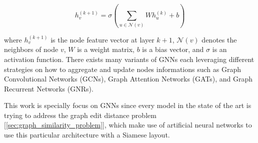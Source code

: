 \documentclass[../Thesis.tex]{subfiles}
\begin{document}
	\[
	h_v^{(k+1)} = \sigma \left( \sum_{u \in \mathcal{N}(v)} W h_u^{(k)} + b \right)
	\]
	
	where \(h_v^{(k+1)}\) is the node feature vector at layer \(k+1\), \(\mathcal{N}(v)\) denotes the neighbors of node \(v\), \(W\) is a weight matrix, \(b\) is a bias vector, and \(\sigma\) is an activation function. There exists many variants of GNNs each leveraging different strategies on how to aggregate and update nodes informations such as Graph Convolutional Networks (GCNs), Graph Attention Networks (GATs), and Graph Recurrent Networks (GNRs).
	
	
	
	This work is specially focus on GNNs since every model in the state of the art is trying to address the graph edit distance problem [\autoref{sec:graph_similarity_problem}], which make use of artificial neural networks to use this particular architecture with a Siamese layout.
	
\end{document}
